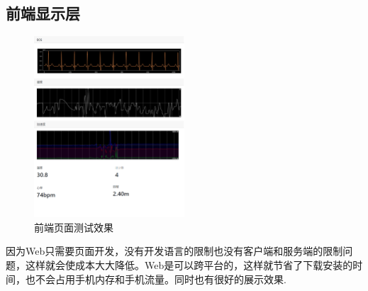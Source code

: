 \documentclass[scheme=chinese,a4paper]{article}
\begin{document}
\subsection{前端显示层}
\begin{figure}[H]
\centering
\includegraphics[width=0.5\textwidth]{final.png}
\caption{前端页面测试效果}
\end{figure}
因为Web只需要页面开发，没有开发语言的限制也没有客户端和服务端的限制问题，这样就会使成本大大降低。Web是可以跨平台的，这样就节省了下载安装的时间，也不会占用手机内存和手机流量。同时也有很好的展示效果. 
\end{document}

